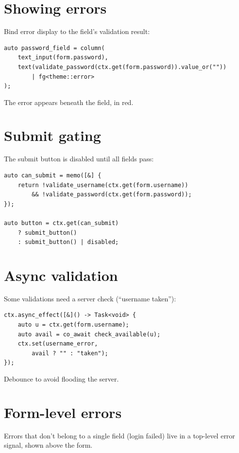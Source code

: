\section{Showing errors}

Bind error display to the field's validation result:

\begin{lstlisting}
auto password_field = column(
    text_input(form.password),
    text(validate_password(ctx.get(form.password)).value_or(""))
        | fg<theme::error>
);
\end{lstlisting}

The error appears beneath the field, in red.

\section{Submit gating}

The submit button is disabled until all fields pass:

\begin{lstlisting}
auto can_submit = memo([&] {
    return !validate_username(ctx.get(form.username))
        && !validate_password(ctx.get(form.password));
});

auto button = ctx.get(can_submit)
    ? submit_button()
    : submit_button() | disabled;
\end{lstlisting}

\section{Async validation}

Some validations need a server check (``username taken''):

\begin{lstlisting}
ctx.async_effect([&]() -> Task<void> {
    auto u = ctx.get(form.username);
    auto avail = co_await check_available(u);
    ctx.set(username_error,
        avail ? "" : "taken");
});
\end{lstlisting}

Debounce to avoid flooding the server.

\section{Form-level errors}

Errors that don't belong to a single field (login failed)
live in a top-level error signal, shown above the form.


